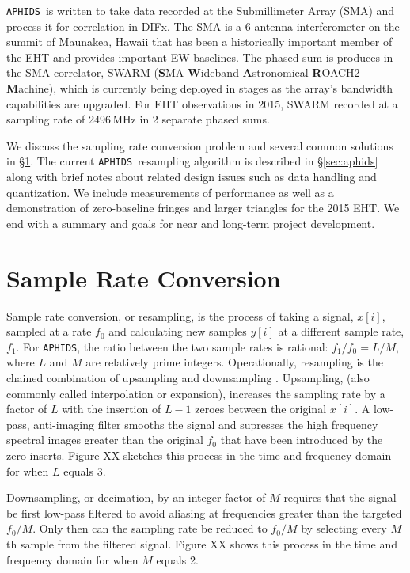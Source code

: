\documentclass[11pt,preprint]{aastex}
\newcommand{\APHIDS}{\texttt{APHIDS}}
\begin{document}
\APHIDS\, is written to take data recorded at the Submillimeter Array (SMA) and process it for correlation in 
DIFx.  The SMA is a 6 antenna interferometer on the summit of Maunakea, Hawaii that has been a historically 
important member of the EHT and provides important EW baselines.  The phased sum is produces in the SMA 
correlator, SWARM (\textbf{S}MA \textbf{W}ideband \textbf{A}stronomical \textbf{R}OACH2 \textbf{M}achine), which is currently being deployed in stages as the array's bandwidth capabilities are 
upgraded.  For EHT observations in 2015, SWARM recorded at a sampling rate of 2496\,MHz in 2 separate phased
sums.

We discuss the sampling rate conversion problem and several common solutions in \S\ref{sec:src_basics}.
The current \APHIDS\, resampling algorithm is described in \S\ref{sec:aphids} along with brief notes about related 
design issues such as data handling and quantization.  We include measurements of performance as well as a 
demonstration of zero-baseline fringes and larger triangles for the 2015 EHT.  We end with a summary and 
goals for near and long-term project development.

\section{Sample Rate Conversion} \label{sec:src_basics}

Sample rate conversion, or resampling, is the process of taking a signal, $x[i]$, sampled at a rate $f_0$ and 
calculating new samples $y[i]$ at a different sample rate, $f_1$.  For \APHIDS, the ratio between the two 
sample rates is rational: $f_1/f_0 = L/M$, where $L$ and $M$ are relatively prime integers.  Operationally, 
resampling is the 
chained combination of upsampling and downsampling \citep{oppenheim10,lyons11}.  Upsampling, (also commonly 
called interpolation or expansion), 
increases the sampling rate 
by a factor of $L$ with the insertion of $L-1$ zeroes between the original $x[i]$.  A low-pass, 
anti-imaging filter smooths the signal and supresses the high frequency spectral images greater than the original 
$f_0$ that have been introduced by the zero inserts.  Figure XX sketches this process in the time and frequency 
domain for when $L$ equals 3. 

Downsampling, or decimation, by an integer factor of $M$ requires that the signal be first low-pass filtered to 
avoid aliasing 
at frequencies greater than the targeted $f_0/M$.  Only then can the sampling rate be reduced to $f_0/M$ by 
selecting every $M$th sample from the filtered signal.  Figure XX shows this process in the time and frequency 
domain for when $M$ equals 2.
\end{document}
